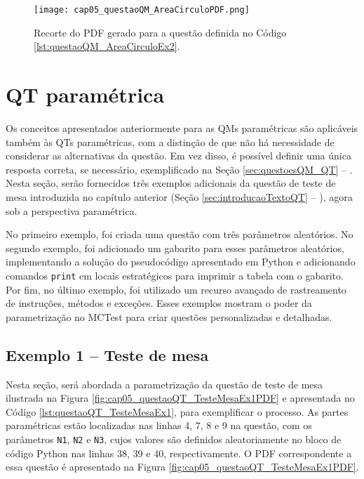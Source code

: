 \begin{figure}[!ht]
  \texttt{[image: cap05\_questaoQM\_AreaCirculoPDF.png]}
  \caption{Recorte do PDF gerado para a questão definida no Código \ref{lst:questaoQM_AreaCirculoEx2}.}
  \label{fig:cap05_questaoQM_AreaCirculoPDF}
\end{figure}

\section{QT paramétrica}

Os conceitos apresentados anteriormente para as QMs paramétricas são aplicáveis também às QTs paramétricas, com a distinção de que não há necessidade de considerar as alternativas da questão. Em vez disso, é possível definir uma única resposta correta, se necessário, exemplificado na Seção \ref{sec:questoesQM_QT} -- . Nesta seção, serão fornecidos três exemplos adicionais da questão de teste de mesa introduzida no capítulo anterior (Seção \ref{sec:introducaoTextoQT} -- ), agora sob a perspectiva paramétrica.

No primeiro exemplo, foi criada uma questão com três parâmetros aleatórios. No segundo exemplo, foi adicionado um gabarito para esses parâmetros aleatórios, implementando a solução do pseudocódigo apresentado em Python e adicionando comandos \verb|print| em locais estratégicos para imprimir a tabela com o gabarito. Por fim, no último exemplo, foi utilizado um recurso avançado de rastreamento de instruções, métodos e exceções.
%
Esses exemplos mostram o poder da parametrização no MCTest para criar questões personalizadas e detalhadas.

\subsection{Exemplo 1 -- Teste de mesa}

Nesta seção, será abordada a parametrização da questão de teste de mesa ilustrada na Figura \ref{fig:cap05_questaoQT_TesteMesaEx1PDF} e apresentada no Código \ref{lst:questaoQT_TesteMesaEx1}, para exemplificar o processo. As partes paramétricas estão localizadas nas linhas 4, 7, 8 e 9 na questão, com os parâmetros \verb|N1|, \verb|N2| e \verb|N3|, cujos valores são definidos aleatoriamente no bloco de código Python nas linhas 38, 39 e 40, respectivamente. O PDF correspondente a essa questão é apresentado na Figura \ref{fig:cap05_questaoQT_TesteMesaEx1PDF}.


